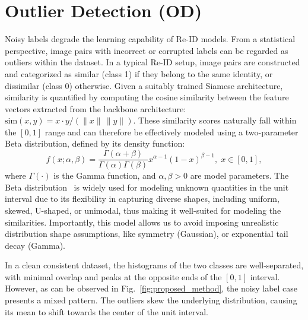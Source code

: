 \documentclass[lettersize,journal]{IEEEtran}
\begin{document}

\section{Outlier Detection (OD)}
\label{sec:OD}
Noisy labels degrade the learning capability of Re-ID models. From a statistical perspective, image pairs with incorrect or corrupted labels can be regarded as outliers within the dataset. In a typical Re-ID setup, image pairs are constructed and categorized as similar (class 1) if they belong to the same identity, or dissimilar (class 0) otherwise. Given a suitably trained Siamese architecture, similarity is quantified by computing the cosine similarity between the feature vectors extracted from the backbone architecture: 
$\text{sim}(x, y) ={x \cdot y}/(\|x\| \, \|y\|)$. These similarity scores naturally fall within the $[0,1]$ range and can therefore be effectively modeled using a two-parameter Beta distribution, defined by its density function:
\begin{equation}
    f(x; \alpha, \beta) = \frac{\Gamma(\alpha + \beta)}{\Gamma(\alpha)\Gamma(\beta)} x^{\alpha - 1} (1 - x)^{\beta - 1}, \; x\in[0,1],
    \label{eq:betapdf}
\end{equation}
where $\Gamma(\cdot)$ is the Gamma function, and $\alpha, \beta>0$ are model parameters.
The Beta distribution~\cite{gupta2004handbook} is widely used for modeling unknown quantities in the unit interval due to its flexibility in capturing diverse shapes, including uniform, skewed, U-shaped, or unimodal, thus making it well-suited for modeling the similarities. Importantly, this model allows us to avoid imposing unrealistic distribution shape assumptions, like symmetry (Gaussian), or exponential tail decay (Gamma).

In a clean consistent dataset, the histograms of the two classes are well-separated, with minimal overlap and peaks at the opposite ends of the $[0,1]$ interval. However, as can be observed in Fig.~\ref{fig:proposed_method}, the noisy label case presents a mixed pattern. The outliers skew the underlying distribution, causing its mean to shift towards the center of the unit interval. 
\end{document}
